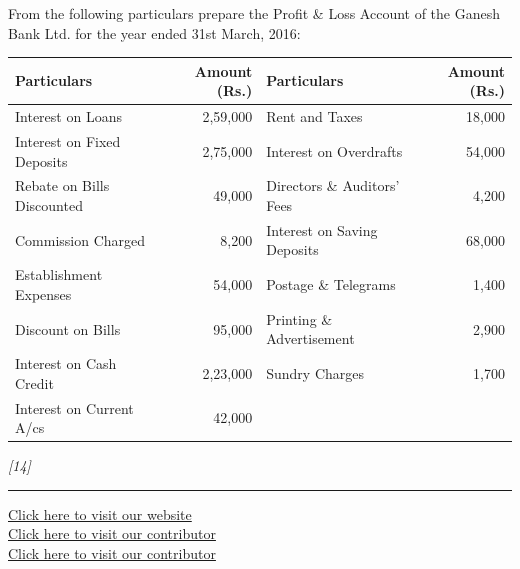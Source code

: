 \documentclass[11pt,a4paper]{article}
\newcommand{\pts}[1]{\hfill   \textit{[#1]}}
\begin{document}
From the following particulars prepare the Profit \& Loss Account of the Ganesh Bank Ltd. for the year ended 31st March, 2016:


\begin{center}
\footnotesize

\begin{tabular}{|l|r||l|r|}
\hline
   \textbf{Particulars} &   \textbf{Amount (Rs.)} &   \textbf{Particulars} &   \textbf{Amount (Rs.)} \\
\hline
Interest on Loans & 2,59,000 & Rent and Taxes & 18,000 \\
Interest on Fixed Deposits & 2,75,000 & Interest on Overdrafts & 54,000 \\
Rebate on Bills Discounted & 49,000 & Directors \& Auditors' Fees & 4,200 \\
Commission Charged & 8,200 & Interest on Saving Deposits & 68,000 \\
Establishment Expenses & 54,000 & Postage \& Telegrams & 1,400 \\
Discount on Bills & 95,000 & Printing \& Advertisement & 2,900 \\
Interest on Cash Credit & 2,23,000 & Sundry Charges & 1,700 \\
Interest on Current A/cs & 42,000 & & \\
\hline
\end{tabular}
\end{center}\pts{14}


\vfill
\rule{\linewidth}{0.4pt}

\begin{center}\small
\href{https://bhu-exam.vercel.app/}{Click here to visit our website}\\[4pt]
\href{https://me-aryan.vercel.app/}{Click here to visit our contributor}\\[4pt]
\href{https://quashan-me.vercel.app/}{Click here to visit our contributor}
\end{center}
\end{document}
